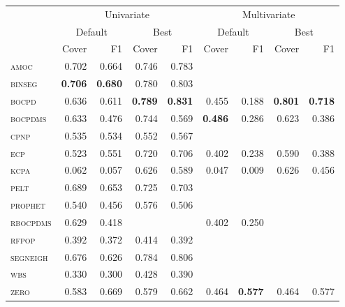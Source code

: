 \begin{tabular}{lrr|rrrr|rr}
 & \multicolumn{4}{c}{Univariate} & \multicolumn{4}{c}{Multivariate} \\\cmidrule(lr){2-5}\cmidrule(lr){6-9}
 & \multicolumn{2}{c}{Default} & \multicolumn{2}{c}{Best} & \multicolumn{2}{c}{Default} & \multicolumn{2}{c}{Best} \\\cmidrule(lr){2-3}\cmidrule(lr){4-5}\cmidrule(lr){6-7}\cmidrule(lr){8-9}
 & Cover & F1 & Cover & F1 & Cover & F1 & Cover & F1\\\cmidrule(r){1-1}\cmidrule(lr){2-5}\cmidrule(l){6-9}
\textsc{amoc}     & 0.702 & 0.664 & 0.746 & 0.783 &       &       &       &       \\
\textsc{binseg}   & \textbf{0.706} & \textbf{0.680} & 0.780 & 0.803 &       &       &       &       \\
\textsc{bocpd}    & 0.636 & 0.611 & \textbf{0.789} & \textbf{0.831} & 0.455 & 0.188 & \textbf{0.801} & \textbf{0.718} \\
\textsc{bocpdms}  & 0.633 & 0.476 & 0.744 & 0.569 & \textbf{0.486} & 0.286 & 0.623 & 0.386 \\
\textsc{cpnp}     & 0.535 & 0.534 & 0.552 & 0.567 &       &       &       &       \\
\textsc{ecp}      & 0.523 & 0.551 & 0.720 & 0.706 & 0.402 & 0.238 & 0.590 & 0.388 \\
\textsc{kcpa}     & 0.062 & 0.057 & 0.626 & 0.589 & 0.047 & 0.009 & 0.626 & 0.456 \\
\textsc{pelt}     & 0.689 & 0.653 & 0.725 & 0.703 &       &       &       &       \\
\textsc{prophet}  & 0.540 & 0.456 & 0.576 & 0.506 &       &       &       &       \\
\textsc{rbocpdms} & 0.629 & 0.418 &       &       & 0.402 & 0.250 &       &       \\
\textsc{rfpop}    & 0.392 & 0.372 & 0.414 & 0.392 &       &       &       &       \\
\textsc{segneigh} & 0.676 & 0.626 & 0.784 & 0.806 &       &       &       &       \\
\textsc{wbs}      & 0.330 & 0.300 & 0.428 & 0.390 &       &       &       &       \\
\textsc{zero}     & 0.583 & 0.669 & 0.579 & 0.662 & 0.464 & \textbf{0.577} & 0.464 & 0.577 \\
\cmidrule(r){1-1}\cmidrule(lr){2-5}\cmidrule(l){6-9}
\end{tabular}
